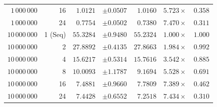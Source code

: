 \documentclass[11pt]{article}
\begin{document}
\begin{table}[h!]
\begin{tabular}{r r r r r r r}
$1\,000\,000$ & 16      & $1.0121$ & $\pm 0.0507$ & $1.0160$ & $5.723\times$ & $0.358$ \\
$1\,000\,000$ & 24      & $0.7754$ & $\pm 0.0502$ & $0.7380$ & $\mathbf{7.470\times}$ & $0.311$ \\
\midrule
$10\,000\,000$ & 1 (Seq) & $55.3284$ & $\pm 0.9480$ & $55.2324$ & $1.000\times$ & $1.000$ \\
$10\,000\,000$ & 2       & $27.8892$ & $\pm 0.4135$ & $27.8663$ & $1.984\times$ & $0.992$ \\
$10\,000\,000$ & 4       & $15.6217$ & $\pm 0.5314$ & $15.7616$ & $3.542\times$ & $0.885$ \\
$10\,000\,000$ & 8       & $10.0093$ & $\pm 1.1787$ & $9.1694$  & $5.528\times$ & $0.691$ \\
$10\,000\,000$ & 16      & $7.4881$  & $\pm 0.9660$ & $7.7809$  & $7.389\times$ & $0.462$ \\
$10\,000\,000$ & 24      & $7.4428$  & $\pm 0.6552$ & $7.2518$  & $\mathbf{7.434\times}$ & $0.310$ \\
\bottomrule
\end{tabular}
\end{table}
\end{document}
